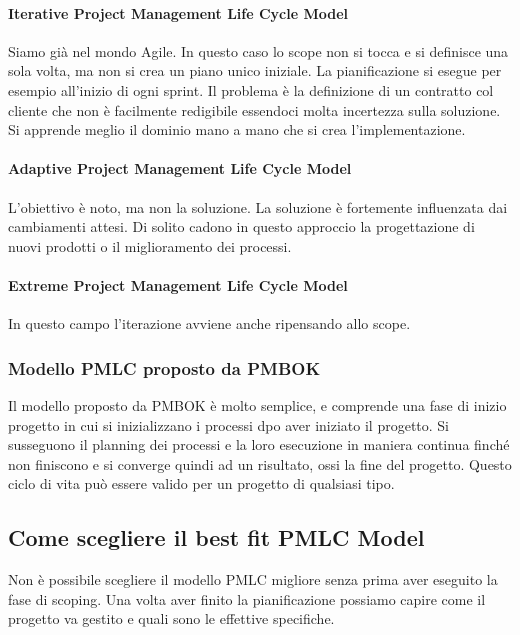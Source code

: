 \paragraph{Iterative Project Management Life Cycle Model}
Siamo già nel mondo Agile. In questo caso lo scope non si tocca e si definisce una sola volta, ma non si crea un piano unico iniziale. La pianificazione si esegue per esempio all'inizio di ogni sprint. Il problema è la definizione di un contratto col cliente che non è facilmente redigibile essendoci molta incertezza sulla soluzione. Si apprende meglio il dominio mano a mano che si crea l'implementazione.
\paragraph{Adaptive Project Management Life Cycle Model}
L'obiettivo è noto, ma non la soluzione. La soluzione è fortemente influenzata dai cambiamenti attesi. Di solito cadono in questo approccio la progettazione di nuovi prodotti o il miglioramento dei processi.
\paragraph{Extreme Project Management Life Cycle Model}
In questo campo l'iterazione avviene anche ripensando allo scope.
\subsubsection{Modello PMLC proposto da PMBOK}
Il modello proposto da PMBOK è molto semplice, e comprende una fase di inizio progetto in cui si inizializzano i processi dpo aver iniziato il progetto. Si susseguono il planning dei processi e la loro esecuzione in maniera continua finché non finiscono e si converge quindi ad un risultato, ossi la fine del progetto. Questo ciclo di vita può essere valido per un progetto di qualsiasi tipo.
\subsection{Come scegliere il best fit PMLC Model}
Non è possibile scegliere il modello PMLC migliore senza prima aver eseguito la fase di scoping. Una volta aver finito la pianificazione possiamo capire come il progetto va gestito e quali sono le effettive specifiche.
